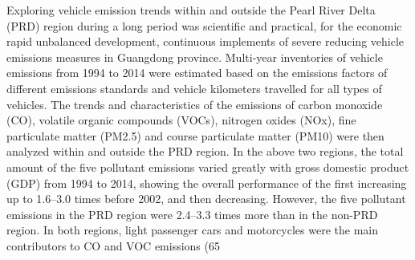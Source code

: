 Exploring vehicle emission trends within and outside the Pearl River Delta (PRD) region during a long period was scientific and practical, for the economic rapid unbalanced development, continuous implements of severe reducing vehicle emissions measures in Guangdong province. Multi-year inventories of vehicle emissions from 1994 to 2014 were estimated based on the emissions factors of different emissions standards and vehicle kilometers travelled for all types of vehicles. The trends and characteristics of the emissions of carbon monoxide (CO), volatile organic compounds (VOCs), nitrogen oxides (NOx), fine particulate matter (PM2.5) and course particulate matter (PM10) were then analyzed within and outside the PRD region. In the above two regions, the total amount of the five pollutant emissions varied greatly with gross domestic product (GDP) from 1994 to 2014, showing the overall performance of the first increasing up to 1.6–3.0 times before 2002, and then decreasing. However, the five pollutant emissions in the PRD region were 2.4–3.3 times more than in the non-PRD region. In both regions, light passenger cars and motorcycles were the main contributors to CO and VOC emissions (65%
